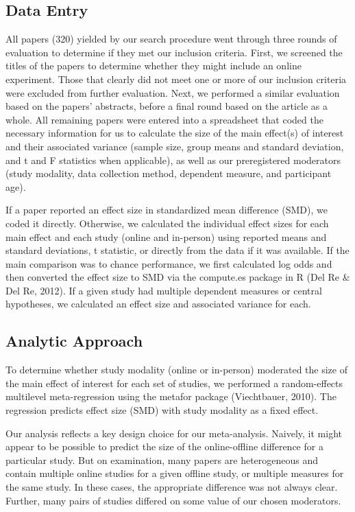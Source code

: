 \documentclass[
  man,floatsintext]{apa6}
\begin{document}
\hypertarget{data-entry}{%
\subsection{Data Entry}\label{data-entry}}

All papers (320) yielded by our search procedure went through three rounds of evaluation to determine if they met our inclusion criteria. First, we screened the titles of the papers to determine whether they might include an online experiment. Those that clearly did not meet one or more of our inclusion criteria were excluded from further evaluation. Next, we performed a similar evaluation based on the papers' abstracts, before a final round based on the article as a whole. All remaining papers were entered into a spreadsheet that coded the necessary information for us to calculate the size of the main effect(s) of interest and their associated variance (sample size, group means and standard deviation, and t and F statistics when applicable), as well as our preregistered moderators (study modality, data collection method, dependent measure, and participant age).

If a paper reported an effect size in standardized mean difference (SMD), we coded it directly. Otherwise, we calculated the individual effect sizes for each main effect and each study (online and in-person) using reported means and standard deviations, t statistic, or directly from the data if it was available. If the main comparison was to chance performance, we first calculated log odds and then converted the effect size to SMD via the compute.es package in R (Del Re \& Del Re, 2012). If a given study had multiple dependent measures or central hypotheses, we calculated an effect size and associated variance for each.

\hypertarget{analytic-approach}{%
\subsection{Analytic Approach}\label{analytic-approach}}

To determine whether study modality (online or in-person) moderated the size of the main effect of interest for each set of studies, we performed a random-effects multilevel meta-regression using the metafor package (Viechtbauer, 2010). The regression predicts effect size (SMD) with study modality as a fixed effect.

Our analysis reflects a key design choice for our meta-analysis. Naively, it might appear to be possible to predict the size of the online-offline difference for a particular study. But on examination, many papers are heterogeneous and contain multiple online studies for a given offline study, or multiple measures for the same study. In these cases, the appropriate difference was not always clear. Further, many pairs of studies differed on some value of our chosen moderators.
\end{document}
